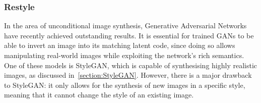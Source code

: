 %
%
\subsubsection{Restyle}
\label{section:restyle}
In the area of unconditional image synthesis, Generative Adversarial Networks have recently achieved outstanding results. 
It is essential for trained GANs to be able to invert an image into its matching latent code, since doing so allows manipulating real-world images while exploiting the network's rich semantics.
One of these models is StyleGAN, which is capable of synthesising highly realistic images, as discussed in~\ref{section:StyleGAN}. However, there is a major drawback to StyleGAN: it only allows for the synthesis of new images in a specific style, meaning that it cannot change the style of an existing image.

